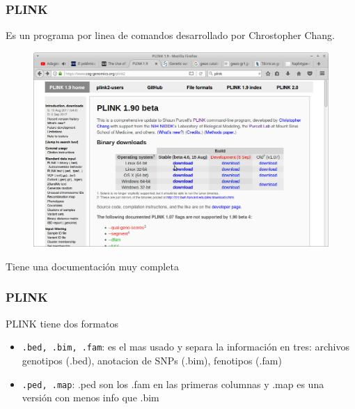 \documentclass{beamer}\usepackage[]{graphicx}\usepackage[]{color}
\begin{document}
\begin{frame}[fragile]
\frametitle{PLINK}
Es un programa por linea de comandos desarrollado por Chrostopher Chang.

\begin{figure}[htbp]
\begin{center}
\includegraphics[width=.8\linewidth]{plink.png}
\end{center}
\end{figure}

Tiene una documentaci\'on muy completa
\end{frame}


\begin{frame}[fragile]
\frametitle{PLINK}
PLINK tiene dos formatos
\begin{itemize}
\item {\tt .bed, .bim, .fam}: es el mas usado y separa la informaci\'on en tres: archivos genotipos (.bed), anotacion de SNPs (.bim), fenotipos (.fam)  

\item {\tt .ped, .map}: .ped son los .fam en las primeras columnas y .map es una versi\'on con menos info que .bim
 
\end{itemize}
\end{frame}
\end{document}
